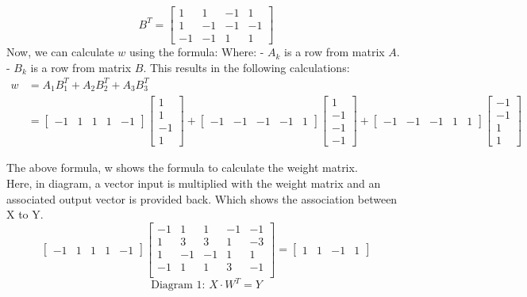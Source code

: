 \documentclass[12pt]{article}
\begin{document}
\[
B^T = \begin{bmatrix}
1 & 1 & -1 & 1 \\
1 & -1 & -1 & -1 \\
-1 & -1 & 1 & 1 
\end{bmatrix}
\]
Now, we can calculate \( w \) using the formula:
Where:
- \( A_k \) is a row from matrix \( A \).
- \( B_k \) is a row from matrix \( B \).
This results in the following calculations:
\[
\begin{aligned}
w &= A_1 B_1^T + A_2 B_2^T + A_3 B_3^T \\
  &= \begin{bmatrix}
-1 & 1 & 1 & 1 & -1 
\end{bmatrix}
\begin{bmatrix}
1 \\
1 \\
-1 \\
1 
\end{bmatrix}
+
\begin{bmatrix}
-1 & -1 & -1 & -1 & 1 
\end{bmatrix}
\begin{bmatrix}
1 \\
-1 \\
-1 \\
-1 
\end{bmatrix}
+
\begin{bmatrix}
-1 & -1 & -1 & 1 & 1 
\end{bmatrix}
\begin{bmatrix}
-1 \\
-1 \\
1 \\
1 
\end{bmatrix}
\end{aligned}
\]

The above formula, w shows the formula to calculate the weight matrix. \\

Here, in diagram, a vector input is multiplied with the weight matrix and an associated output vector is provided back. Which shows the association between X to Y. 
\[
\begin{bmatrix}
-1 & 1 & 1 & 1 & -1
\end{bmatrix}
\begin{bmatrix}
-1 &  1 &  1 & -1 & -1 \\
 1 &  3 &  3 &  1 & -3 \\
 1 & -1 & -1 &  1 &  1 \\
 -1 &  1 &  1 &  3 & -1 \\
\end{bmatrix}
=
\begin{bmatrix}
1 & 1 & -1 & 1
\end{bmatrix}
\]
\[
\text{Diagram 1: } X \cdot W^T = Y
\]
\end{document}
